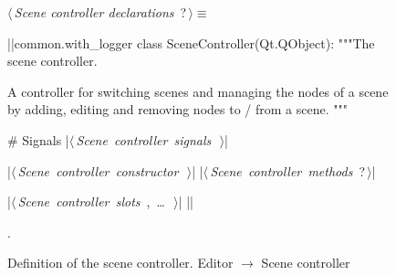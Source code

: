 \documentclass[%
    a4paper,    %
    justified,  %
    nobib,      %
    openany     %
]{tufte-book}
\makeatletter
\renewcommand{\label}[1]{\@tufte@label{##1}}%
\makeatother
\begin{document}
\begin{figure}
\begin{flushleft} \small
\begin{minipage}{\linewidth}\label{scrap87}\raggedright\small
{} $\langle\,${\itshape Scene controller declarations}\nobreak\ {\footnotesize {?}}$\,\rangle\equiv$
\vspace{-1ex}
\begin{pythoncode}
|\normalfont{}\fontfamily{}|common.with_logger
class SceneController(Qt.QObject):
    """The scene controller.

    A controller for switching scenes and managing the nodes of a scene by
    adding, editing and removing nodes to / from a scene.
    """

    # Signals
    |\hbox{$\langle\,${\itshape Scene controller signals}\nobreak\ {\footnotesize {}}$\,\rangle$}|

    |\hbox{$\langle\,${\itshape Scene controller constructor}\nobreak\ {\footnotesize {}}$\,\rangle$}|
    |\hbox{$\langle\,${\itshape Scene controller methods}\nobreak\ {\footnotesize ?}$\,\rangle$}|

    |\hbox{$\langle\,${\itshape Scene controller slots}\nobreak\ {\footnotesize {}, \ldots\ }$\,\rangle$}|
|\NWsep|
\end{pythoncode}
\vspace{1.5ex}
\footnotesize
\begin{list}{}{\setlength{\itemsep}{-\parsep}\setlength{\itemindent}{-\leftmargin}}
\item {\NWtxtMacroNoRef}.

\item{}
\end{list}
\end{minipage}\vspace{4ex}
\end{flushleft}
\caption{Definition of the scene controller.
  \newline{}\newline{}Editor $\rightarrow$ Scene controller}
\label{editor:lst:scene-controller}
\end{figure}
\end{document}
